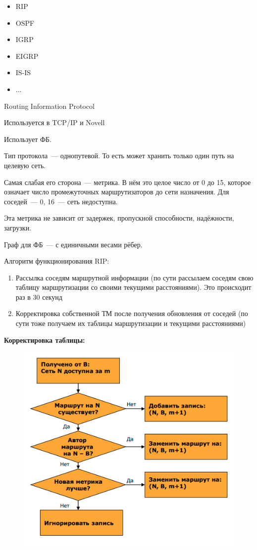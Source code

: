 \begin{itemize}
    \item RIP
    \item OSPF
    \item IGRP
    \item EIGRP
    \item IS-IS
    \item ...
\end{itemize}


Routing Information Protocol

Используется в TCP/IP и Novell

Использует ФБ.

Тип протокола~--- однопутевой. То есть может хранить только один путь на целевую сеть.

Самая слабая его сторона~--- метрика. В нём это целое число от 0 до 15, которое означает число промежуточных маршрутизаторов до сети назначения. Для соседей~--- 0, 16~--- сеть недоступна.

Эта метрика не зависит от задержек, пропускной способности, надёжности, загрузки.

Граф для ФБ~--- с единичными весами рёбер.

Алгоритм функционирования RIP:
\begin{enumerate}
    \item Рассылка соседям маршрутной информации (по сути рассылаем соседям свою таблицу маршрутизации со своими текущими расстояниями). Это происходит раз в 30 секунд
    \item Корректировка собственной ТМ после получения обновления от соседей (по сути тоже получаем их таблицы маршрутизации и текущими расстояниями)
\end{enumerate}

{\bf Корректировка таблицы:}

\begin{figure}[H]
  \centering
  \includegraphics[width=15cm]{images/04/05}
\end{figure}

